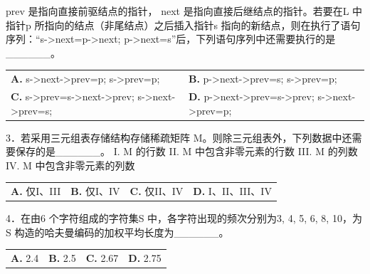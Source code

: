 \documentclass[UTF8,11pt]{ctexart}
\begin{document}
prev 是指向直接前驱结点的指针， next 是指向直接后继结点的指针。若要在L 中指针p 所指向的结点（非尾结点）之后插入指针s 指向的新结点，则在执行了语句序列：“s->next=p->next; p->next=s”后，下列语句序列中还需要执行的是\_\_\_\_\_\_。


\begin{center}\begin{tabular}{>{\raggedright\arraybackslash}p{\dimexpr(\linewidth-4\tabcolsep)/2\relax}>{\raggedright\arraybackslash}p{\dimexpr(\linewidth-4\tabcolsep)/2\relax}}
\textbf{A.} s->next->prev=p; s->prev=p; & \textbf{B.} p->next->prev=s; s->prev=p;\\[.35em]
\textbf{C.} s->prev=s->next->prev; s->next->prev=s; & \textbf{D.} p->next->prev=s->prev; s->next->prev=p;\\[.35em]\end{tabular}\end{center}

3．若采用三元组表存储结构存储稀疏矩阵 M。则除三元组表外，下列数据中还需要保存的是\_\_\_\_\_\_。 I. M 的行数 II. M 中包含非零元素的行数 III. M 的列数 IV. M 中包含非零元素的列数


\begin{center}\begin{tabular}{>{\raggedright\arraybackslash}p{\dimexpr(\linewidth-8\tabcolsep)/4\relax}>{\raggedright\arraybackslash}p{\dimexpr(\linewidth-8\tabcolsep)/4\relax}>{\raggedright\arraybackslash}p{\dimexpr(\linewidth-8\tabcolsep)/4\relax}>{\raggedright\arraybackslash}p{\dimexpr(\linewidth-8\tabcolsep)/4\relax}}
\textbf{A.} 仅I、III & \textbf{B.} 仅I、IV & \textbf{C.} 仅II、IV & \textbf{D.} I、II、III、IV\\[.35em]\end{tabular}\end{center}

4．在由6 个字符组成的字符集S 中，各字符出现的频次分别为3, 4, 5, 6, 8, 10，为S 构造的哈夫曼编码的加权平均长度为\_\_\_\_\_\_。


\begin{center}\begin{tabular}{>{\raggedright\arraybackslash}p{\dimexpr(\linewidth-8\tabcolsep)/4\relax}>{\raggedright\arraybackslash}p{\dimexpr(\linewidth-8\tabcolsep)/4\relax}>{\raggedright\arraybackslash}p{\dimexpr(\linewidth-8\tabcolsep)/4\relax}>{\raggedright\arraybackslash}p{\dimexpr(\linewidth-8\tabcolsep)/4\relax}}
\textbf{A.} 2.\allowbreak{}4 & \textbf{B.} 2.\allowbreak{}5 & \textbf{C.} 2.\allowbreak{}67 & \textbf{D.} 2.\allowbreak{}75\\[.35em]\end{tabular}\end{center}
\end{document}
